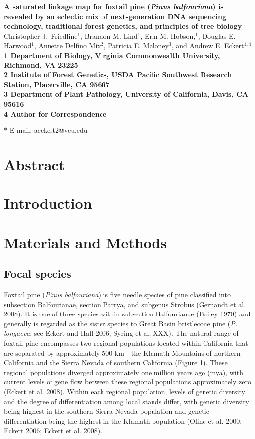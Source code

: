 \documentclass[11pt]{article}
\begin{document}
\begin{flushleft} 
{\Large \textbf{A saturated linkage map for foxtail pine (\textit{Pinus balfouriana}) is revealed by an eclectic mix of next-generation DNA sequencing technology, traditional forest genetics, and principles of tree biology}}
\\
Christopher J.\ Friedline$^{1}$, 
Brandon M. Lind$^{1}$,
Erin M. Hobson,$^{1}$,
Douglas E. Harwood$^{1}$, 
Annette Delfino Mix$^{2}$,
Patricia E. Maloney$^{3}$, and
Andrew E. Eckert$^{1,4}$
\\
\bf{1} Department of Biology, Virginia Commonwealth University, Richmond, VA 23225
\\
\bf{2} Institute of Forest Genetics, USDA Pacific Southwest Research Station, Placerville, CA 95667
\\
\bf{3} Department of Plant Pathology, University of California, Davis, CA 95616
\\
\bf{4} Author for Correspondence

$\ast$ E-mail: aeckert2@vcu.edu
\end{flushleft}

\section{Abstract}

\section{Introduction}

\section{Materials and Methods}

\subsection{Focal species}
Foxtail pine (\textit{Pinus balfouriana}) is five needle species of pine classified into subsection Balfourianae, section Parrya, and subgenus Strobus (Gernandt et al. 2008). It is one of three species within subsection Balfourianae (Bailey 1970) and generally is regarded as the sister species to Great Basin bristlecone pine (\textit{P. longaeva}; see Eckert and Hall 2006; Syring et al. XXX). The natural range of foxtail pine encompasses two regional populations located within California that are separated by approximately 500 km - the Klamath Mountains of northern California and the Sierra Nevada of southern California (Figure 1). These regional populations diverged approximately one million years ago (mya), with current levels of gene flow between these regional populations approximately zero (Eckert et al. 2008). Within each regional population, levels of genetic diversity and the degree of differentiation among local stands differ, with genetic diversity being highest in the southern Sierra Nevada population and genetic differentiation being the highest in the Klamath population (Oline et al. 2000; Eckert 2006; Eckert et al. 2008).
\end{document}

